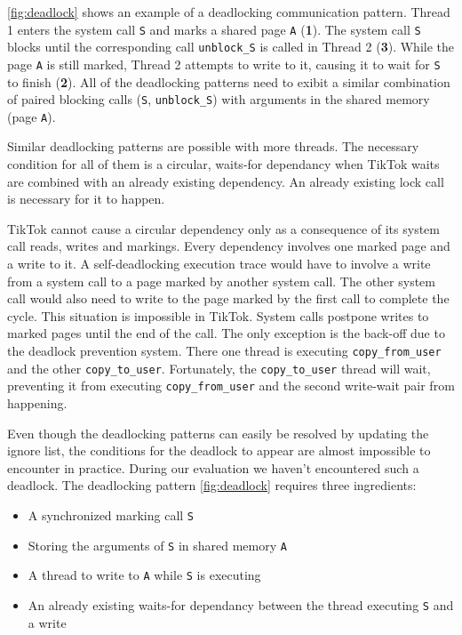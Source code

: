 \documentclass[conference]{IEEEtran}
\newcommand{\sysname}{TikTok}
\begin{document}
\autoref{fig:deadlock} shows an example of a deadlocking communication pattern. Thread
1 enters the system call \texttt{S} and marks a shared page \texttt{A}
(\textbf{1}). The system call \texttt{S} blocks until the corresponding call
\texttt{unblock\_S} is called in Thread 2 (\textbf{3}). While the page
\texttt{A} is still marked, Thread 2 attempts to write to it, causing it to wait
for \texttt{S} to finish (\textbf{2}). All of the deadlocking patterns need to
exibit a similar combination of paired blocking calls (\texttt{S},
\texttt{unblock\_S}) with arguments in the shared memory (page \texttt{A}).

Similar deadlocking patterns are possible with more threads. The necessary
condition for all of them is a circular, waits-for dependancy when \sysname
waits are combined with an already existing dependency. An already
existing lock call is necessary for it to happen.

\sysname{} cannot cause a circular dependency only as a consequence of its system
call reads, writes and markings. Every dependency involves one marked page and a
write to it. A self-deadlocking execution trace would have to involve a write
from a system call to a page marked by another system call. The other system
call would also need to write to the page marked by the first call to complete
the cycle. This situation is impossible in \sysname. System calls postpone
writes to marked pages until the end of the call. The only exception is the
back-off due to the deadlock prevention system. There one thread is executing
\texttt{copy\_from\_user} and the other \texttt{copy\_to\_user}. Fortunately,
the \texttt{copy\_to\_user} thread will wait, preventing it from executing
\texttt{copy\_from\_user} and the second write-wait pair from happening.

Even though the deadlocking patterns can easily be resolved by updating the
ignore list, the conditions for the deadlock to appear are almost impossible to
encounter in practice. During our evaluation we haven't encountered such a
deadlock. The deadlocking pattern \autoref{fig:deadlock} requires three
ingredients:

\begin{itemize}
  \item A synchronized marking call \texttt{S}
  \item Storing the arguments of \texttt{S} in shared memory \texttt{A}
  \item A thread to write to \texttt{A} while \texttt{S} is executing
  \item An already existing waits-for dependancy between the thread executing \texttt{S} and a write
\end{itemize}
\end{document}
